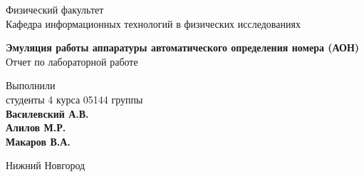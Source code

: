 

\makeatletter
\begin{titlepage}
	
	\newpage
	
    \noindent{}
    
	\vspace*{50pt}
    
	Физический факультет \\[\baselineskip]
    
	Кафедра информационных технологий в физических исследованиях

	\vspace*{100pt}

	{\Large\textbf{Эмуляция работы аппаратуры автоматического определения номера (АОН)}} \\[\baselineskip]

	Отчет по лабораторной работе

	\vspace*{\fill}

	\hfill\begin{minipage}{15em}
    	Выполнили\\
		студенты 4 курса 05144 группы\\
		\textbf{Василевский А.В.}\\
		\textbf{Алилов М.Р.}\\
		\textbf{Макаров В.А.}
    \end{minipage}
    
	
    
	\vspace*{\fill}
    
	Нижний Новгород\par
    
	
\end{titlepage}
\makeatother